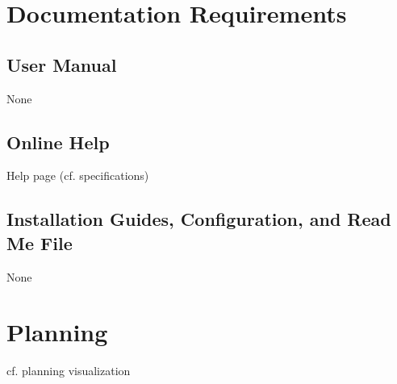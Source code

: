 \documentclass [a4paper, 11pt]{article}
\begin{document}
\section{Documentation Requirements}
\subsection{User Manual}
None

\subsection{Online Help}
Help page (cf. specifications)

\subsection{Installation Guides, Configuration, and Read Me File}
None



\section{Planning}
cf. planning visualization
\end{document}
